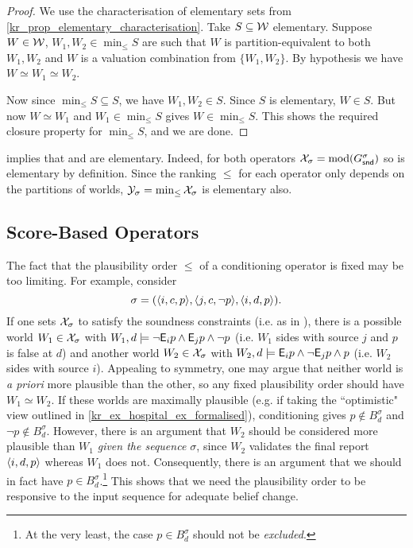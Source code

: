 \begin{proof}
    We use the characterisation of elementary sets from
    \cref{kr_prop_elementary_characterisation}. Take $S \subseteq \mathcal{W}$ elementary.
    Suppose $W \in \mathcal{W}$, $W_1, W_2 \in \min_{\le}{S}$ are such that $W$ is
    partition-equivalent to both $W_1, W_2$ and $W$ is a valuation combination
    from $\{W_1, W_2\}$. By hypothesis we have $W \simeq W_1 \simeq W_2$.

    Now since $\min_{\le}{S} \subseteq S$, we have $W_1, W_2 \in S$. Since $S$
    is elementary, $W \in S$. But now $W \simeq W_1$ and $W_1 \in
    \min_{\le}{S}$ gives $W \in \min_{\le}{S}$. This shows the required closure
    property for $\min_{\le}{S}$, and we are done.
\end{proof}

 implies that
\varbasedcond{} and \partbasedcond{} are elementary. Indeed, for both operators
$\mathcal{X}_\sigma = \operatorname{mod}(G^\sigma_{\mathsf{snd}})$ so is elementary by definition. Since the
ranking $\le$ for each operator only depends on the partitions of worlds,
$\mathcal{Y}_\sigma =
\min_{\le}{\mathcal{X}_\sigma}$ is elementary also.

\subsection{Score-Based Operators}
\label{kr_sec_score_based}

The fact that the plausibility order $\le$ of a conditioning operator is fixed
may be too limiting. For example, consider
\[
    \sigma
    =
    (\langle {i, c, p} \rangle,
    \langle {j, c, \neg p} \rangle,
    \langle {i, d, p} \rangle).
\]
%
If one sets $\mathcal{X}_\sigma$ to satisfy the soundness constraints (i.e. as in
\weakop{}), there is a possible
world $W_1 \in \mathcal{X}_\sigma$ with $W_1, d \models \neg \mathsf{E}_i{p} \land \mathsf{E}_j{p} \land
\neg p$ (i.e. $W_1$ sides with source $j$ and $p$ is false at $d$) and another
world $W_2 \in \mathcal{X}_\sigma$ with $W_2, d \models \mathsf{E}_i{p} \land \neg \mathsf{E}_j{p} \land
p$ (i.e. $W_2$ sides with source $i$). Appealing to symmetry, one may argue
that neither world is \emph{a priori} more plausible than the other, so any
fixed plausibility order should have $W_1 \simeq W_2$. If these worlds
are maximally plausible (e.g. if taking the ``optimistic" view outlined in
\cref{kr_ex_hospital_ex_formalised}), conditioning gives $p \notin B^\sigma_d$ and
$\neg p \notin B^\sigma_d$.
%
However, there is an argument that $W_2$ should be considered more plausible
than $W_1$ \emph{given the sequence $\sigma$}, since $W_2$ validates the final
report $\langle {i, d, p} \rangle$ whereas $W_1$ does not. Consequently, there is an
argument that we should in fact have $p \in B^\sigma_d$.\footnote{At the very
least, the case $p \in B^\sigma_d$ should not be \emph{excluded}.} This shows
that we need the plausibility order to be responsive to the input sequence for
adequate belief change.\footnotemark{}

